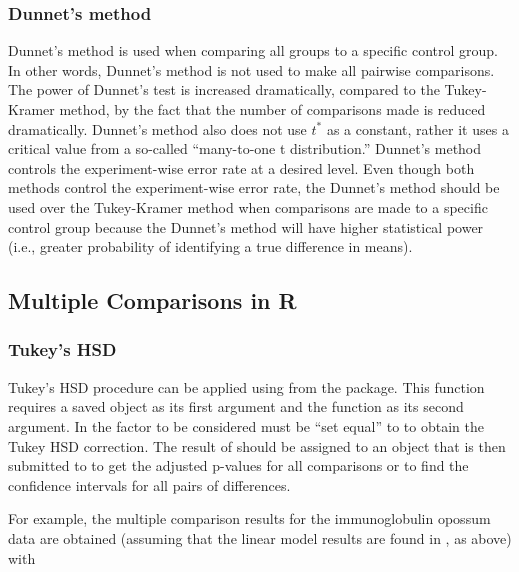 \documentclass[10pt,openany]{book}\usepackage[]{graphicx}\usepackage[]{color}
\begin{document}
\subsubsection{Dunnet's method}
Dunnet's method is used when comparing all groups to a specific control group.  In other words, Dunnet's method is not used to make all pairwise comparisons.  The power of Dunnet's test is increased dramatically, compared to the Tukey-Kramer method, by the fact that the number of comparisons made is reduced dramatically.  Dunnet's method also does not use $t^{*}$ as a constant, rather it uses a critical value from a so-called ``many-to-one t distribution.''  Dunnet's method controls the experiment-wise error rate at a desired level.  Even though both methods control the experiment-wise error rate, the Dunnet's method should be used over the Tukey-Kramer method when comparisons are made to a specific control group because the Dunnet's method will have higher statistical power (i.e., greater probability of identifying a true difference in means).


\subsection{Multiple Comparisons in R}
\subsubsection*{Tukey's HSD}
Tukey's HSD procedure can be applied using  from the  package.  This function requires a saved  object as its first argument and the  function as its second argument.  In  the factor to be considered must be ``set equal'' to  to obtain the Tukey HSD correction.  The result of  should be assigned to an object that is then submitted to  to get the adjusted p-values for all comparisons or  to find the confidence intervals for all pairs of differences.

For example, the multiple comparison results for the immunoglobulin opossum data are obtained (assuming that the linear model results are found in , as above) with
\end{document}
